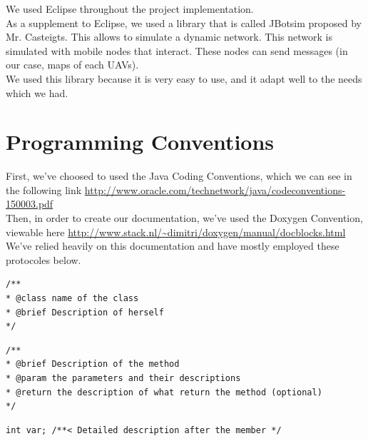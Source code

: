 We used Eclipse throughout the project implementation.\\

As a supplement to Eclipse, we used a library that is called JBotsim \cite{JBotSim} proposed by Mr. Casteigts. This allows to simulate a dynamic network. This network is simulated with mobile nodes that interact. These nodes can send messages (in our case, maps of each UAVs).\\

We used this library because it is very easy to use, and it adapt well to the needs which we had.

\section{Programming Conventions}

First, we've choosed to used the Java Coding Conventions, which we can see in the following link \url{http://www.oracle.com/technetwork/java/codeconventions-150003.pdf}\\

Then, in order to create our documentation, we've used the Doxygen Convention, viewable here \url{http://www.stack.nl/~dimitri/doxygen/manual/docblocks.html}\\
We've relied heavily on this documentation and have mostly employed these protocoles below.\\

\begin{lstlisting}[frame=trBL, title=Doxygen Convention for classes]
/**
* @class name of the class
* @brief Description of herself
*/
\end{lstlisting}

\begin{lstlisting}[frame=trBL, title=Doxygen Convention for methods]
/**
* @brief Description of the method
* @param the parameters and their descriptions
* @return the description of what return the method (optional)
*/
\end{lstlisting}

\begin{lstlisting}[frame=trBL, title=Doxygen Convention for members]
int var; /**< Detailed description after the member */
\end{lstlisting}
~\\

